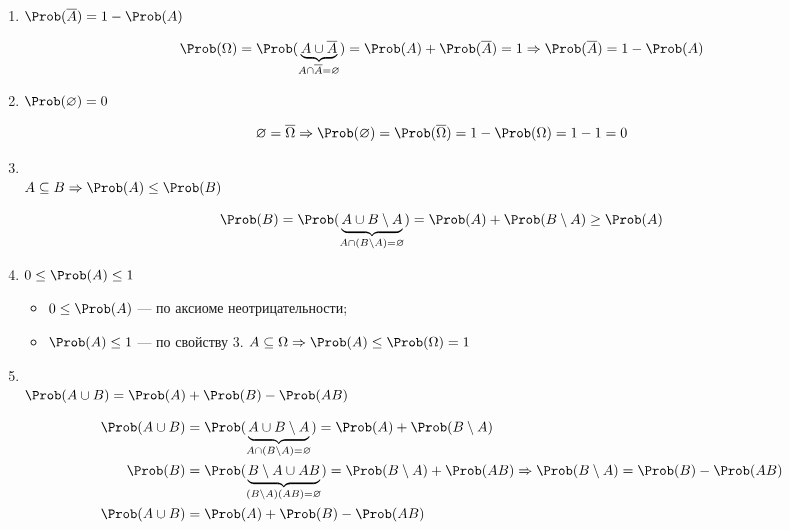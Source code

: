 \begin{enumerate}
	\item {} $\Prob(\overline{A}) = 1 - \Prob(A)$
	\begin{Proof}
		\[
			\Prob(\spaceoutcomes) = \Prob(\underbrace{A \cup \overline{A}}_{A \cap \overline{A} = \emptyset}) = \Prob(A) + \Prob(\overline{A}) = 1	\Rightarrow \Prob(\overline{A}) = 1 - \Prob(A)
		\]
	\end{Proof}
	
	\item {} $\Prob(\emptyset) = 0$
	\begin{Proof}
		\[
			\emptyset = \overline{\spaceoutcomes} \Rightarrow \Prob(\emptyset) = \Prob(\overline{\spaceoutcomes}) = 1 - \Prob(\spaceoutcomes) = 1 - 1 = 0
		\]
	\end{Proof} 
	
	\item {}\\ $A \subseteq B \Rightarrow \Prob(A) \leq \Prob(B)$
	\begin{Proof}
		\[
			\Prob(B) = \Prob(\underbrace{A \cup B \setminus A}_{A \cap (B \setminus A) = \emptyset}) = \Prob(A) + \Prob(B \setminus A) \geq \Prob(A)
		\]
	\end{Proof}
	
	\item {} $0 \leq \Prob(A) \leq 1$
	\begin{Proof}
		\begin{itemize}
			\item $0 \leq \Prob(A)$ --- по аксиоме неотрицательности;
			\item $\Prob(A) \leq 1$ --- по свойству $3.$ $A \subseteq \spaceoutcomes \Rightarrow \Prob(A) \leq \Prob(\spaceoutcomes) = 1$
		\end{itemize}
	\end{Proof}
	
	\item {} \\ $\Prob(A \cup B) = \Prob(A) + \Prob(B) - \Prob(AB)$
	\begin{Proof}
		\begin{align*}
			\Prob(A \cup B) &= \Prob(\underbrace{A \cup B \setminus A}_{A \cap (B \setminus A) = \emptyset}) = \Prob(A) + \Prob(B \setminus A) \\
			\Prob(B) &= \Prob(\underbrace{B \setminus A \cup AB}_{(B \setminus A)(AB) = \emptyset}) = \Prob(B \setminus A) + \Prob(AB) \Rightarrow \Prob(B \setminus A) = \Prob(B) - \Prob(AB) \\
			\Prob(A \cup B) &= \Prob(A) + \Prob(B) - \Prob(AB)
		\end{align*}
	\end{Proof}
	

\end{enumerate}

